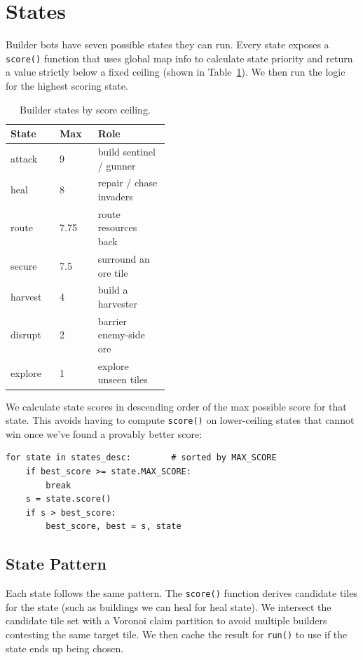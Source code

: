 \documentclass[10pt,sigconf,nonacm]{acmart}
\newcommand{\code}[1]{{%
  \def\_{\char`\_\discretionary{}{}{}}%
  \texttt{\small #1}%
}}
\begin{document}
\section{States}

Builder bots have seven possible states they can run. Every state exposes a \code{score()} function that uses global map info to calculate state priority and return a value strictly below a fixed ceiling (shown in Table~\ref{tab:states}). We then run the logic for the highest scoring state.

\begin{table}[htbp]
  \caption{Builder states by score ceiling.}
  \label{tab:states}
  \begin{tabular}{llp{0.45\linewidth}}
    \toprule
    State   & Max  & Role                    \\
    \midrule
    attack  & 9    & build sentinel / gunner \\
    heal    & 8    & repair / chase invaders \\
    route   & 7.75 & route resources back    \\
    secure  & 7.5  & surround an ore tile    \\
    harvest & 4    & build a harvester       \\
    disrupt & 2    & barrier enemy-side ore  \\
    explore & 1    & explore unseen tiles    \\
    \bottomrule
  \end{tabular}
\end{table}

We calculate state scores in descending order of the max possible score for that state. This avoids having to compute \code{score()} on lower-ceiling states that cannot win once we've found a provably better score:

\begin{lstlisting}
for state in states_desc:        # sorted by MAX_SCORE
    if best_score >= state.MAX_SCORE:
        break
    s = state.score()
    if s > best_score:
        best_score, best = s, state
\end{lstlisting}

\subsection{State Pattern}

Each state follows the same pattern. The \code{score()} function derives candidate tiles for the state (such as buildings we can heal for heal state). We intersect the candidate tile set with a Voronoi claim partition to avoid multiple builders contesting the same target tile. We then cache the result for \code{run()} to use if the state ends up being chosen.
\end{document}

